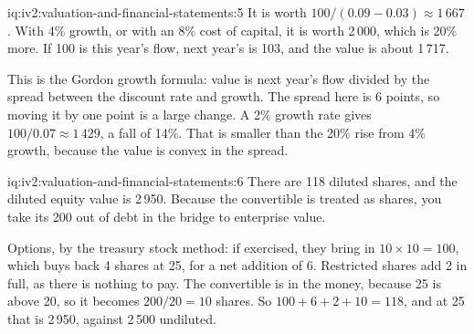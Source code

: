 \begin{solution}{iq:iv2:valuation-and-financial-statements:5}
It is worth $100/(0.09 - 0.03) \approx 1\,667$. With 4\% growth, or with an 8\% cost of capital, it is worth 2\,000, which is 20\% more. If 100 is this year's flow, next year's is 103, and the value is about 1\,717.

This is the Gordon growth formula: value is next year's flow divided by the spread between the discount rate and growth. The spread here is 6 points, so moving it by one point is a large change. A 2\% growth rate gives $100/0.07 \approx 1\,429$, a fall of 14\%. That is smaller than the 20\% rise from 4\% growth, because the value is convex in the spread.

\end{solution}

\begin{solution}{iq:iv2:valuation-and-financial-statements:6}
There are 118 diluted shares, and the diluted equity value is 2\,950. Because the convertible is treated as shares, you take its 200 out of debt in the bridge to enterprise value.

Options, by the treasury stock method: if exercised, they bring in $10 \times 10 = 100$, which buys back 4 shares at 25, for a net addition of 6. Restricted shares add 2 in full, as there is nothing to pay. The convertible is in the money, because 25 is above 20, so it becomes $200/20 = 10$ shares. So $100 + 6 + 2 + 10 = 118$, and at 25 that is 2\,950, against 2\,500 undiluted.

\end{solution}

